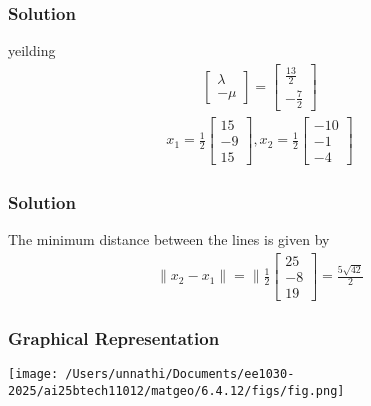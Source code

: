 \documentclass{beamer}
\begin{document}
 \begin{frame}
\frametitle{Solution}
 yeilding 
\begin{align}
    \begin{bmatrix}\lambda \\ -\mu\end{bmatrix} = \begin{bmatrix}\frac{13}{2} \\ -\frac{7}{2}\end{bmatrix}
\end{align}
\begin{align}
    \textbf{$x_1$} =\frac{1}{2} \begin{bmatrix}15 \\ -9 \\ 15\end{bmatrix} ,
        \textbf{$x_2$} =\frac{1}{2} \begin{bmatrix}-10 \\ -1 \\ -4\end{bmatrix}
\end{align}
\end{frame}

 \begin{frame}
\frametitle{Solution}
The minimum distance between the lines is given by
\begin{align}
    \lVert \textbf{$x_2$} - \textbf{$x_1$} \rVert = \lVert \frac{1}{2}\begin{bmatrix}25 \\ -8 \\ 19\end{bmatrix}
     = \frac{5\sqrt{42}}{2}
\end{align}
\end{frame}

\begin{frame}

\frametitle{Graphical Representation}
\begin{center}
\texttt{[image: /Users/unnathi/Documents/ee1030-2025/ai25btech11012/matgeo/6.4.12/figs/fig.png]}
\end{center}
\end{frame}
\end{document}
